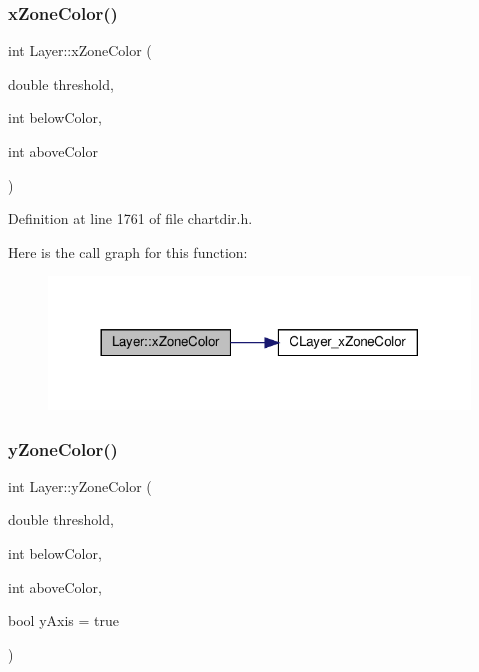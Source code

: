 \subsubsection{\texorpdfstring{x\+Zone\+Color()}{xZoneColor()}}
{\footnotesize\ttfamily int Layer\+::x\+Zone\+Color (\begin{DoxyParamCaption}\item[{double}]{threshold,  }\item[{int}]{below\+Color,  }\item[{int}]{above\+Color }\end{DoxyParamCaption})\hspace{0.3cm}{\ttfamily [inline]}}



Definition at line 1761 of file chartdir.\+h.

Here is the call graph for this function\+:
\nopagebreak
\begin{figure}[H]
\begin{center}
\leavevmode
\includegraphics[width=317pt]{class_layer_a7a721e59aa2ade3230ba2ad76bab643a_cgraph}
\end{center}
\end{figure}
\mbox{\label{class_layer_ae8ce1036fc1aa65453eaf08612e96e33}} 
\subsubsection{\texorpdfstring{y\+Zone\+Color()}{yZoneColor()}\hspace{0.1cm}{\footnotesize\ttfamily [1/2]}}
{\footnotesize\ttfamily int Layer\+::y\+Zone\+Color (\begin{DoxyParamCaption}\item[{double}]{threshold,  }\item[{int}]{below\+Color,  }\item[{int}]{above\+Color,  }\item[{bool}]{y\+Axis = {\ttfamily true} }\end{DoxyParamCaption})\hspace{0.3cm}{\ttfamily [inline]}}



